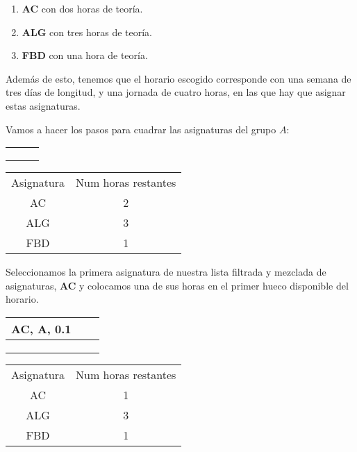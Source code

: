 \begin{enumerate}[$\bullet$]
    \item \textbf{AC} con dos horas de teoría.
    \item \textbf{ALG} con tres horas de teoría.
    \item \textbf{FBD} con una hora de teoría.
\end{enumerate}

Además de esto, tenemos que el horario escogido corresponde con una semana de tres días de longitud, y una jornada de cuatro horas, en las que hay que asignar estas asignaturas.


Vamos a hacer los pasos para cuadrar las asignaturas del grupo $A$:

\begin{minipage}{0.5\textwidth}    
\begin{tabular}{| c | c | c |}
\hline
 &  &  \\
 \hline
 &  &  \\
 \hline
 &  &  \\
 \hline
 &  &  \\
 \hline 
\end{tabular}
\end{minipage}
\begin{minipage}{0.5\textwidth}
\begin{tabular}{c | c}
Asignatura & Num horas restantes \\
AC & 2 \\
ALG & 3 \\
FBD & 1
\end{tabular}
\end{minipage}

Seleccionamos la primera asignatura de nuestra lista filtrada y mezclada de asignaturas, \textbf{AC} y colocamos una de sus horas en el primer hueco disponible del horario. 

\begin{minipage}{0.5\textwidth}    
\begin{tabular}{| c | c | c |}
\hline
AC, A, 0.1 &  &  \\
 \hline
 &  &  \\
 \hline
 &  &  \\
 \hline
 &  &  \\
 \hline 
\end{tabular}
\end{minipage}
\begin{minipage}{0.5\textwidth}
\begin{tabular}{c | c}
Asignatura & Num horas restantes \\
AC & 1 \\
ALG & 3 \\
FBD & 1
\end{tabular}
\end{minipage}

